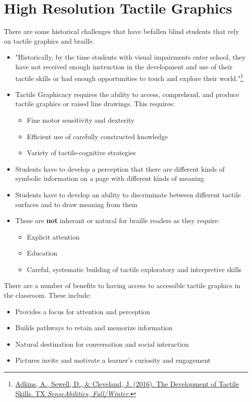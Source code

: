 \documentclass[14pt,letterpaper,twoside]{extreport}
\begin{document}
\pagebreak 
	\hypertarget{tactile-graphics-high-resolution-complex-graphics}{}\section{High Resolution Tactile Graphics}\label{tactile-graphics-high-resolution-complex-graphics}
There are some historical challenges that have befallen blind students that rely on tactile graphics and braille. 
\begin{itemize}[leftmargin=*]
\item "Historically, by the time students with visual impairments enter school, they have not received enough instruction in the development and use of their tactile skills or had enough opportunities to touch and explore their world."\footnote{\href{https://www.tsbvi.edu/tx-senseabilities/issues/fall-winter-2016/the-development-of-tactile-skills}{Adkins, A., Sewell, D., \& Cleveland, J. (2016). The Development of Tactile Skills. TX \textit{SenseAbilities, Fall/Winter}.}}
\item Tactile Graphicacy requires the ability to access, comprehend, and produce tactile graphics or raised line drawings. This requires:\begin{itemize}
    \item Fine motor sensitivity and dexterity
    \item Efficient use of carefully constructed knowledge
    \item Variety of tactile-cognitive strategies
\end{itemize}
\item Students have to develop a perception that there are different kinds of symbolic information on a page with different kinds of meaning
\item Students have to develop an ability to discriminate between different tactile surfaces and to draw meaning from them
\item These are \textbf{not} inherant or natural for braille readers as they require:
\begin{itemize}
    \item Explicit attention
    \item Education 
    \item Careful, systematic building of tactile exploratory and interpretive skills
\end{itemize}

\end{itemize}

There are a number of benefits to having access to accessible tactile graphics in the classroom. These include:
\begin{itemize}[leftmargin=*]
\item Provides a focus for attention and perception
\item Builds pathways to retain and memorize information
\item Natural destination for conversation and social interaction
\item Pictures invite and motivate a learner's curiosity and engagement
\end{itemize}
\end{document}
